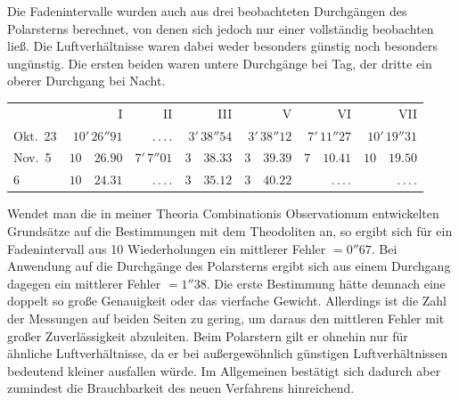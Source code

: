 Die Fadenintervalle wurden auch aus drei beobachteten Durchgängen des Polarsterns berechnet, von denen sich jedoch nur einer vollständig beobachten ließ. Die Luftverhältnisse waren dabei weder besonders günstig noch besonders ungünstig. Die ersten beiden waren untere Durchgänge bei Tag, der dritte ein oberer Durchgang bei Nacht.

\begin{center}
\begingroup\small\setlength{\tabcolsep}{4pt}
\begin{tabular}{l|r|r|r|r|r|r}
 & I & II & III & V & VI & VII \\
Okt.\ 23 & $10'\,26''91$ & .\,.\,.\,. & $3'\,38''54$ & $3'\,38''12$ & $7'\,11''27$ & $10'\,19''31$ \\
Nov.\ 5 & $10\quad26.90$ & $7'\,7''01$ & $3\quad38.33$ & $3\quad39.39$ & $7\quad10.41$ & $10\quad19.50$ \\
\phantom{Nov.\ }6 & $10\quad24.31$ & .\,.\,.\,. & $3\quad35.12$ & $3\quad40.22$ & .\,.\,.\,. & .\,.\,.\,. \\
\end{tabular}
\endgroup
\end{center}

Wendet man die in meiner Theoria Combinationis Observationum entwickelten Grundsätze auf die Bestimmungen mit dem Theodoliten an, so ergibt sich für ein Fadenintervall aus 10 Wiederholungen ein mittlerer Fehler $= 0''67$. Bei Anwendung auf die Durchgänge des Polarsterns ergibt sich aus einem Durchgang dagegen ein mittlerer Fehler $= 1''38$. Die erste Bestimmung hätte demnach eine doppelt so große Genauigkeit oder das vierfache Gewicht. Allerdings ist die Zahl der Messungen
%
auf beiden Seiten zu gering, um daraus den mittleren Fehler mit großer Zuverlässigkeit abzuleiten. Beim Polarstern gilt er ohnehin nur für ähnliche Luftverhältnisse, da er bei außergewöhnlich günstigen Luftverhältnissen bedeutend kleiner ausfallen würde. Im Allgemeinen bestätigt sich dadurch aber zumindest die Brauchbarkeit des neuen Verfahrens hinreichend.


